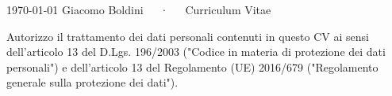 \documentclass[11pt, a4paper]{awesome-cv}
\newif\ifsignature
\newif\ifcvinheader
\providecommand{\cvlang}{en}
\newcommand{\cvsignaturelabel}{Signature}
\newcommand{\cvprivacynotice}{%
I authorize the processing of my personal data contained in this CV 
pursuant to Article 13 of Legislative Decree No. 196/2003 ("Personal Data Protection Code")
and Article 13 of GDPR 679/16 ("General Data Protection Regulation").%
}
\renewcommand{\cvsignaturelabel}{Firma}
\renewcommand{\cvprivacynotice}{%
  Autorizzo il trattamento dei dati personali contenuti in questo CV
  ai sensi dell'articolo 13 del D.Lgs. 196/2003 ("Codice in materia di protezione dei dati personali")
  e dell'articolo 13 del Regolamento (UE) 2016/679 ("Regolamento generale sulla protezione dei dati").%
  }
\begin{document}
\cvinheadertrue
\makecvheader[L]
\cvinheaderfalse

\makecvfooter
  {\today}
  {Giacomo Boldini~~~·~~~Curriculum Vitae}
  {\thepage}









% 
% 
% 
% 

\vfill
\begin{descriptionstyle}{
\cvprivacynotice
}
\end{descriptionstyle}
\ifsignature
\vspace{1.2\baselineskip}
\begin{flushright}
\rule{6cm}{0.4pt}\\
{\footnotesize \cvsignaturelabel}
\end{flushright}
\fi
\vspace{\baselineskip}

\end{document}
